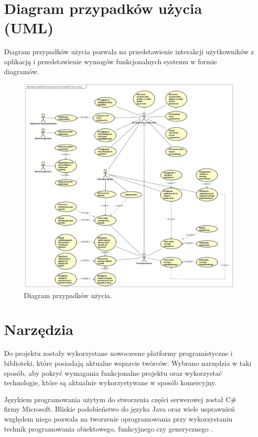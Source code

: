 \documentclass[a4paper,twoside,12pt]{book}
\begin{document}
	\section {Diagram przypadków użycia (UML)}
	Diagram przypadków użycia pozwala na przedstawienie interakcji użytkowników z aplikacją i przedstawienie wymogów funkcjonalnych systemu w formie diagramów.
	
\begin{figure}[H]
	\centering
	\includegraphics[width=\textwidth]{diagram_przypadków_użycia.png}
	\caption{Diagram przypadków użycia.}
	\label{fig:3}
\end{figure}
	
	\section{Narzędzia}
	
	Do projektu zostały wykorzystane nowoczesne platformy programistyczne i biblioteki, które posiadają aktualne wsparcie twórców. Wybrano narzędzia w taki sposób, aby pokryć wymagania funkcjonalne projektu oraz wykorzystać technologie, które są aktualnie wykorzystywane w sposób komercyjny.
	
	Językiem programowania użytym do stworzenia części serwerowej został C\# firmy Microsoft. Bliskie podobieństwo do języka Java oraz wiele usprawnień względem niego pozwala na tworzenie oprogramowania przy wykorzystaniu technik programowania obiektowego, funkcyjnego czy generycznego \cite{bib:csharp}.
	
\end{document}
